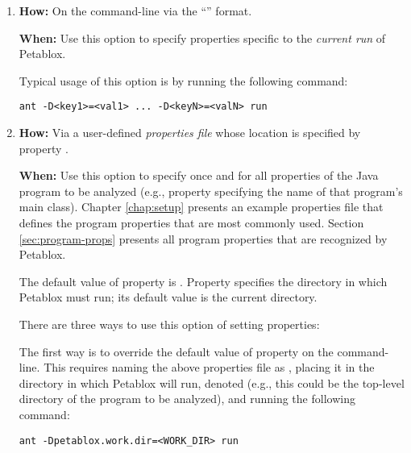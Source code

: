 \begin{enumerate}
\item

{\bf How:} On the command-line via the ``'' format.

{\bf When:} Use this option to specify properties specific to the {\it current run} of Petablox.

Typical usage of this option is by running the following command:

\begin{framed}
\begin{verbatim}
ant -D<key1>=<val1> ... -D<keyN>=<valN> run
\end{verbatim}
\end{framed}

\item

{\bf How:} Via a user-defined {\it properties file} whose location is specified by property .

{\bf When:} Use this option to specify once and for all properties of the
Java program to be analyzed (e.g., property  specifying the
name of that program's main class).
Chapter \ref{chap:setup} presents an example properties file 
that defines the program properties that are most commonly used.  Section \ref{sec:program-props}
presents all program properties that are recognized by Petablox. 

The default value of property  is .
Property  specifies the directory in which Petablox must run; its default value
is the current directory.

There are three ways to use this option of setting properties:

The first way is to override the default value of property  on the command-line.
This requires naming the above properties file as , placing it in the
directory in which Petablox will run, denoted 
(e.g., this could be the top-level directory of the program to be analyzed),
and running the following command:

\begin{framed}
\begin{verbatim}
ant -Dpetablox.work.dir=<WORK_DIR> run
\end{verbatim}
\end{framed}


\end{enumerate}
